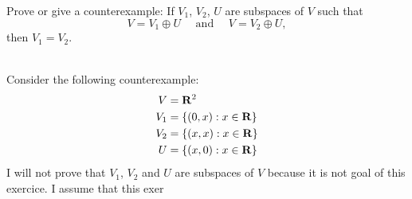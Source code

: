 \begin{exercise}
    Prove or give a counterexample: If $V_1$, $V_2$, $U$ are subspaces of $V$ such that
    $$V = V_1 \oplus U \quad \text{ and } \quad V = V_2 \oplus U,$$
    then $V_1 = V_2$. \\
\end{exercise}

\begin{solution}
    \\ Consider the following counterexample:
    \begin{align*}
        V &= \mathbf{R}^2 \\
        V_1 &= \{(0, x) : x\in \mathbf{R}\} \\
        V_2 &= \{(x,x) : x \in \mathbf{R}\} \\
        U &= \{(x,0) : x \in \mathbf{R}\}
    \end{align*}
    I will not prove that $V_1$, $V_2$ and $U$ are subspaces of $V$ because it is not goal of this exercice. I assume that this exer
\end{solution}